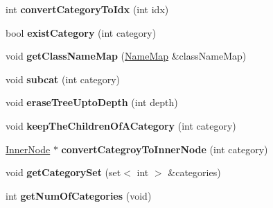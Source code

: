 \begin{DoxyCompactItemize}
\item 
\hypertarget{classMultiBoost_1_1ClassHierarchy_a44d05fab3eba2b20801c8fe94afa0787}{int {\bfseries convert\-Category\-To\-Idx} (int idx)}\label{classMultiBoost_1_1ClassHierarchy_a44d05fab3eba2b20801c8fe94afa0787}

\item 
\hypertarget{classMultiBoost_1_1ClassHierarchy_a8d3144f17a8d32502f3b335df120124a}{bool {\bfseries exist\-Category} (int category)}\label{classMultiBoost_1_1ClassHierarchy_a8d3144f17a8d32502f3b335df120124a}

\item 
\hypertarget{classMultiBoost_1_1ClassHierarchy_a0d7ab631cce885d626faadf99c4190a5}{void {\bfseries get\-Class\-Name\-Map} (\hyperlink{classMultiBoost_1_1NameMap}{Name\-Map} \&class\-Name\-Map)}\label{classMultiBoost_1_1ClassHierarchy_a0d7ab631cce885d626faadf99c4190a5}

\item 
\hypertarget{classMultiBoost_1_1ClassHierarchy_a54210bf84497402d35a516ac5b55d0ed}{void {\bfseries subcat} (int category)}\label{classMultiBoost_1_1ClassHierarchy_a54210bf84497402d35a516ac5b55d0ed}

\item 
\hypertarget{classMultiBoost_1_1ClassHierarchy_ac343ae35a874bed4567438ac128a3ca1}{void {\bfseries erase\-Tree\-Upto\-Depth} (int depth)}\label{classMultiBoost_1_1ClassHierarchy_ac343ae35a874bed4567438ac128a3ca1}

\item 
\hypertarget{classMultiBoost_1_1ClassHierarchy_ac68b644ad6fc6593afda3203907ed99f}{void {\bfseries keep\-The\-Children\-Of\-A\-Category} (int category)}\label{classMultiBoost_1_1ClassHierarchy_ac68b644ad6fc6593afda3203907ed99f}

\item 
\hypertarget{classMultiBoost_1_1ClassHierarchy_a57681914965d3bd0c6fcef707a167bec}{\hyperlink{classMultiBoost_1_1InnerNode}{Inner\-Node} $\ast$ {\bfseries convert\-Categroy\-To\-Inner\-Node} (int category)}\label{classMultiBoost_1_1ClassHierarchy_a57681914965d3bd0c6fcef707a167bec}

\item 
\hypertarget{classMultiBoost_1_1ClassHierarchy_a5c0c6e60e867487b2e775c32292075ae}{void {\bfseries get\-Category\-Set} (set$<$ int $>$ \&categories)}\label{classMultiBoost_1_1ClassHierarchy_a5c0c6e60e867487b2e775c32292075ae}

\item 
\hypertarget{classMultiBoost_1_1ClassHierarchy_a06272dda5ff806c0e23ced6501e85d74}{int {\bfseries get\-Num\-Of\-Categories} (void)}\label{classMultiBoost_1_1ClassHierarchy_a06272dda5ff806c0e23ced6501e85d74}

\end{DoxyCompactItemize}
